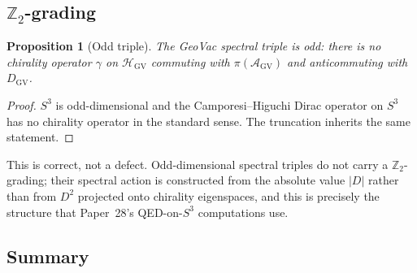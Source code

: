 \documentclass[11pt]{article}
\newtheorem{proposition}{Proposition}
\begin{document}
\subsection{$\mathbb{Z}_2$-grading}

\begin{proposition}[Odd triple]
\label{prop:odd}
The GeoVac spectral triple is \emph{odd}: there is no chirality
operator $\gamma$ on $\mathcal{H}_{\mathrm{GV}}$ commuting with
$\pi(\mathcal{A}_{\mathrm{GV}})$ and anticommuting with
$D_{\mathrm{GV}}$.
\end{proposition}

\begin{proof}
$S^3$ is odd-dimensional and the Camporesi--Higuchi Dirac operator on
$S^3$ has no chirality operator in the standard sense.  The truncation
inherits the same statement.
\end{proof}

This is correct, not a defect.  Odd-dimensional spectral triples do
not carry a $\mathbb{Z}_2$-grading; their spectral action is
constructed from the absolute value $|D|$ rather than from $D^2$
projected onto chirality eigenspaces, and this is precisely the
structure that Paper~28's QED-on-$S^3$ computations use.

\subsection{Summary}
\end{document}
